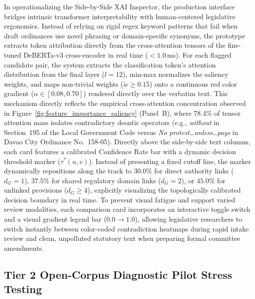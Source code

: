 In operationalizing the Side-by-Side XAI Inspector, the production interface bridges intrinsic transformer interpretability with human-centered legislative ergonomics. Instead of relying on rigid regex keyword patterns that fail when draft ordinances use novel phrasing or domain-specific synonyms, the prototype extracts token attribution directly from the cross-attention tensors of the fine-tuned DeBERTa-v3 cross-encoder in real time ($<1.0$\,ms). For each flagged candidate pair, the system extracts the classification token's attention distribution from the final layer ($l=12$), min-max normalizes the saliency weights, and maps non-trivial weights ($\tilde{w} \ge 0.15$) onto a continuous red color gradient ($\alpha \in [0.08, 0.70]$) rendered directly over the verbatim text. This mechanism directly reflects the empirical cross-attention concentration observed in Figure~\ref{fig:feature_importance_saliency} (Panel~B), where 78.4\% of tensor attention mass isolates contradictory deontic operators (e.g., \textit{without} in Section~195 of the Local Government Code versus \textit{No protest\dots unless\dots pays} in Davao City Ordinance No.~158-05). Directly above the side-by-side text columns, each card features a calibrated Confidence Rate bar with a dynamic decision threshold marker ($\tau^*(u, v)$). Instead of presenting a fixed cutoff line, the marker dynamically repositions along the track to $30.0\%$ for direct authority links ($d_G = 1$), $37.5\%$ for shared regulatory domain links ($d_G = 2$), or $45.0\%$ for unlinked provisions ($d_G \ge 4$), explicitly visualizing the topologically calibrated decision boundary in real time. To prevent visual fatigue and support varied review modalities, each comparison card incorporates an interactive toggle switch and a visual gradient legend bar ($0.0 \rightarrow 1.0$), allowing legislative researchers to switch instantly between color-coded contradiction heatmaps during rapid intake review and clean, unpolluted statutory text when preparing formal committee amendments.


\subsection{Tier 2 Open-Corpus Diagnostic Pilot Stress Testing}
\label{sec:tier2_full_document_benchmark}


